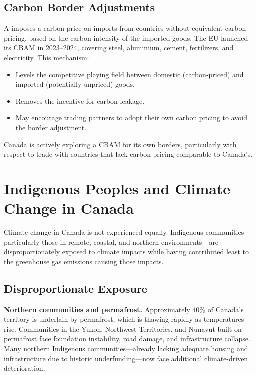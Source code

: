 \subsection{Carbon Border Adjustments}

A  imposes a carbon price on imports from countries without equivalent carbon pricing, based on the carbon intensity of the imported goods. The EU launched its CBAM in 2023--2024, covering steel, aluminium, cement, fertilizers, and electricity. This mechanism:

\begin{itemize}
  \item Levels the competitive playing field between domestic (carbon-priced) and imported (potentially unpriced) goods.
  \item Removes the incentive for carbon leakage.
  \item May encourage trading partners to adopt their own carbon pricing to avoid the border adjustment.
\end{itemize}

Canada is actively exploring a CBAM for its own borders, particularly with respect to trade with countries that lack carbon pricing comparable to Canada's.

\section{Indigenous Peoples and Climate Change in Canada}

Climate change in Canada is not experienced equally. Indigenous communities---particularly those in remote, coastal, and northern environments---are disproportionately exposed to climate impacts while having contributed least to the greenhouse gas emissions causing those impacts.

\subsection{Disproportionate Exposure}

\textbf{Northern communities and permafrost.} Approximately 40\% of Canada's territory is underlain by permafrost, which is thawing rapidly as temperatures rise. Communities in the Yukon, Northwest Territories, and Nunavut built on permafrost face foundation instability, road damage, and infrastructure collapse. Many northern Indigenous communities---already lacking adequate housing and infrastructure due to historic underfunding---now face additional climate-driven deterioration.


